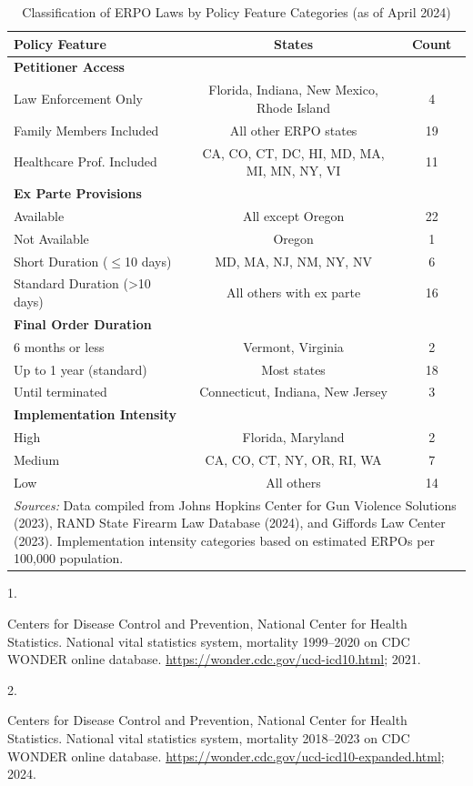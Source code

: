 \documentclass[
  11pt,
]{article}
\newlength{\cslhangindent}
\newlength{\csllabelwidth}
\newenvironment{CSLReferences}[2] %
 {\begin{list}{}{%
  \setlength{\itemindent}{0pt}
  \setlength{\leftmargin}{0pt}
  \setlength{\parsep}{0pt}
  \ifodd #1
   \setlength{\leftmargin}{\cslhangindent}
   \setlength{\itemindent}{-1\cslhangindent}
  \fi
  \setlength{\itemsep}{#2\baselineskip}}}
 {\end{list}}
\newcommand{\CSLLeftMargin}[1]{\parbox[t]{\csllabelwidth}{\strut#1\strut}}
\newcommand{\CSLRightInline}[1]{\parbox[t]{\linewidth - \csllabelwidth}{\strut#1\strut}}
\begin{document}
\begin{table}[ht]
\centering
\caption{Classification of ERPO Laws by Policy Feature Categories (as of April 2024)}
\label{tab:erpo_categories}
\begin{tabular}{lcc}
\toprule
\textbf{Policy Feature} & \textbf{States} & \textbf{Count} \\
\midrule
\textbf{Petitioner Access} & & \\
Law Enforcement Only & Florida, Indiana, New Mexico, Rhode Island & 4 \\
Family Members Included & All other ERPO states & 19 \\
Healthcare Prof. Included & CA, CO, CT, DC, HI, MD, MA, MI, MN, NY, VI & 11 \\
\midrule
\textbf{Ex Parte Provisions} & & \\
Available & All except Oregon & 22 \\
Not Available & Oregon & 1 \\
Short Duration ($\leq$10 days) & MD, MA, NJ, NM, NY, NV & 6 \\
Standard Duration (>10 days) & All others with ex parte & 16 \\
\midrule
\textbf{Final Order Duration} & & \\
6 months or less & Vermont, Virginia & 2 \\
Up to 1 year (standard) & Most states & 18 \\
Until terminated & Connecticut, Indiana, New Jersey & 3 \\
\midrule
\textbf{Implementation Intensity} & & \\
High & Florida, Maryland & 2 \\
Medium & CA, CO, CT, NY, OR, RI, WA & 7 \\
Low & All others & 14 \\
\bottomrule
\multicolumn{3}{p{.95\linewidth}}{\small \textit{Sources:} Data compiled from Johns Hopkins Center for Gun Violence Solutions (2023), RAND State Firearm Law Database (2024), and Giffords Law Center (2023). Implementation intensity categories based on estimated ERPOs per 100,000 population.}
\end{tabular}
\end{table}

\clearpage

\protect{}\label{refs}
\begin{CSLReferences}{0}{1}
\CSLLeftMargin{1. }%
\CSLRightInline{Centers for Disease Control and Prevention, National
Center for Health Statistics. National vital statistics system,
mortality 1999--2020 on CDC WONDER online database.
\url{https://wonder.cdc.gov/ucd-icd10.html}; 2021. }

\CSLLeftMargin{2. }%
\CSLRightInline{Centers for Disease Control and Prevention, National
Center for Health Statistics. National vital statistics system,
mortality 2018--2023 on CDC WONDER online database.
\url{https://wonder.cdc.gov/ucd-icd10-expanded.html}; 2024. }

\end{CSLReferences}
\end{document}
